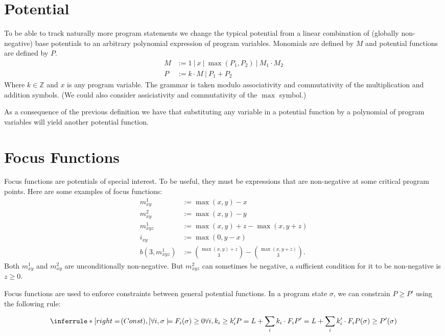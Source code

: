 \documentclass[nocopyrightspace,preprint]{sigplanconf-pldi15}
\begin{document}
\section{Potential}

To be able to track naturally more program statements
we change the typical potential from a linear combination
of (globally non-negative) base potentials to an arbitrary
polynomial expression of program variables. Monomials are
defined by $M$ and potential functions are defined by $P$.
%
\begin{align*}
M &:= 1 ~\vert~ x ~\vert~ \max(P_1, P_2) ~\vert~ M_1 \cdot M_2 \\
P &:= k \cdot M ~\vert~ P_1 + P_2
\end{align*}
%
Where $k \in \mathbb Z$ and $x$ is any program variable.
The grammar is taken modulo associativity and commutativity
of the multiplication and addition symbols. (We could also
consider assiciativity and commutativity of the $\max$ symbol.)

As a consequence of the previous definition we have that
substituting any variable in a potential function by a
polynomial of program variables will yield another potential
function.

\section{Focus Functions}

Focus functions are potentials of special interest.
To be useful, they must be expressions that are non-negative
at some critical program points.  Here are some examples
of focus functions:
%
\begin{align*}
m_{xy}^1 &:= \max(x,y) - x \\
m_{xy}^2 &:= \max(x,y) - y \\
m_{xyz}^1 &:= \max(x, y) + z - \max(x,y+z) \\
i_{xy} &:= \max(0, y - x) \\
b(3, m_{xyz}^{1}) &:= \binom{\max(x,y) + z}{3} - \binom{\max(x, y+z)}{3}.
\end{align*}
%
Both $m_{xy}^1$ and $m_{xy}^2$ are unconditionally non-negative.
But $m_{xyz}^2$ can sometimes be negative, a sufficient condition
for it to be non-negative is $z \ge 0$.

Focus functions are used to enforce constraints between
general potential functions.  In a program state $\sigma$,
we can constrain $P \ge P'$ using the following rule:

$$
\Rule{Const}
{
  \forall i, \sigma \models F_i(\sigma) \ge 0 \\
  \forall i, k_i \ge k'_i \\\\
  P = L + \sum_i k_i \cdot F_i \\
  P' = L + \sum_i k'_i \cdot F_i
}
{P(\sigma) \ge P'(\sigma)}
$$
\end{document}

